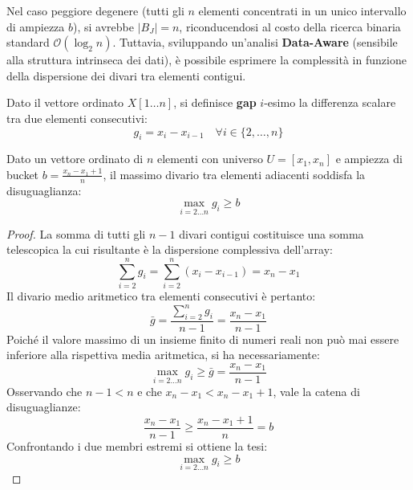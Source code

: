 Nel caso peggiore degenere (tutti gli $n$ elementi concentrati in un unico intervallo di ampiezza $b$), si avrebbe $|B_J| = n$, riconducendosi al costo della ricerca binaria standard $\mathcal{O}(\log_2 n)$. Tuttavia, sviluppando un'analisi \textbf{Data-Aware} (sensibile alla struttura intrinseca dei dati), \`e possibile esprimere la complessit\`a in funzione della dispersione dei divari tra elementi contigui.

\begin{definition}
Dato il vettore ordinato $X[1 \dots n]$, si definisce \textbf{gap} $i$-esimo la differenza scalare tra due elementi consecutivi:
\begin{equation}
  g_i = x_i - x_{i-1} \quad \forall i \in \{2, \dots, n\}
\end{equation}
\end{definition}

\begin{lemma}
\label{lem:gap-massimo}
Dato un vettore ordinato di $n$ elementi con universo $U = [x_1, x_n]$ e ampiezza di bucket $b = \frac{x_n - x_1 + 1}{n}$, il massimo divario tra elementi adiacenti soddisfa la disuguaglianza:
\begin{equation}
  \max_{i=2 \dots n} g_i \ge b
\end{equation}
\end{lemma}

\begin{proof}
La somma di tutti gli $n-1$ divari contigui costituisce una somma telescopica la cui risultante \`e la dispersione complessiva dell'array:
\begin{equation}
  \sum_{i=2}^n g_i = \sum_{i=2}^n (x_i - x_{i-1}) = x_n - x_1
\end{equation}
Il divario medio aritmetico tra elementi consecutivi \`e pertanto:
\begin{equation}
  \bar{g} = \frac{\sum_{i=2}^n g_i}{n - 1} = \frac{x_n - x_1}{n - 1}
\end{equation}
Poich\'e il valore massimo di un insieme finito di numeri reali non pu\`o mai essere inferiore alla rispettiva media aritmetica, si ha necessariamente:
\begin{equation}
  \max_{i=2 \dots n} g_i \ge \bar{g} = \frac{x_n - x_1}{n - 1}
\end{equation}
Osservando che $n - 1 < n$ e che $x_n - x_1 < x_n - x_1 + 1$, vale la catena di disuguaglianze:
\begin{equation}
  \frac{x_n - x_1}{n - 1} \ge \frac{x_n - x_1 + 1}{n} = b
\end{equation}
Confrontando i due membri estremi si ottiene la tesi:
\begin{equation}
  \max_{i=2 \dots n} g_i \ge b
\end{equation}
\end{proof}

